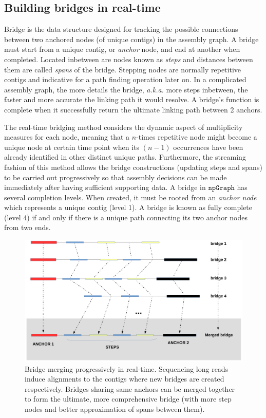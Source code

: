 \documentclass[10pt,twocolumn,twoside]{genpaper}
\newcommand{\npgraph}{$\mathtt{npGraph}$}
\begin{document}
\subsection*{Building bridges in real-time}
Bridge is the data structure designed for tracking the possible connections between two anchored nodes (of unique contigs) in the assembly graph.
A bridge must start from a unique contig, or \emph{anchor} node, and end at another when completed. Located inbetween are nodes known as \emph{steps} and distances between them are called \emph{spans} of the bridge. Stepping nodes are normally repetitive contigs and indicative for a path finding operation later on. In a complicated assembly graph, the more details the bridge, \emph{a.k.a.} more steps inbetween, the faster and more accurate the linking path it would resolve. A bridge's function is complete when it successfully return the ultimate linking path between 2 anchors.

The real-time bridging method considers the dynamic aspect of multiplicity measures for each node, meaning that a $n$-times repetitive node might become a unique node at certain time point when its $(n-1)$ occurrences have been already identified in other distinct unique paths. 
Furthermore, the streaming fashion of this method allows the bridge constructions (updating steps and spans) to be carried out progressively so that assembly decisions can be made immediately after having sufficient supporting data.
A bridge in \npgraph{} has several completion levels. When created, it must be rooted from an \emph{anchor node} which represents a unique contig (level 1). A bridge is known as fully complete (level 4) if and only if there is a unique path connecting its two anchor nodes from two ends. 

\begin{figure}[!hpt]
\centering
\includegraphics[width=.8\textwidth]{images/bridge_merging.pdf}
\caption[Example of bridge merging progressively]{Bridge merging progressively in real-time. Sequencing long reads induce alignments to the contigs where new bridges are created respectively. Bridges sharing same anchors can be merged together to form the ultimate, more comprehensive bridge (with more step nodes and better approximation of spans between them).}
\label{figure:npgraph_merging}
\end{figure}
\end{document}

